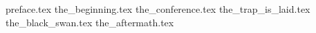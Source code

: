 




{preface.tex}
{the_beginning.tex}
{the_conference.tex}
{the_trap_is_laid.tex}
{the_black_swan.tex}
{the_aftermath.tex}